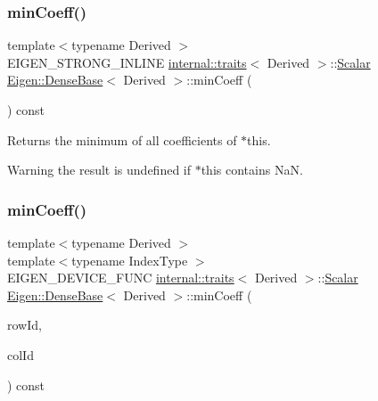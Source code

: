 \subsubsection{\texorpdfstring{minCoeff()}{minCoeff()}\hspace{0.1cm}{\footnotesize\ttfamily [1/3]}}
{\footnotesize\ttfamily template$<$typename Derived $>$ \\
E\+I\+G\+E\+N\+\_\+\+S\+T\+R\+O\+N\+G\+\_\+\+I\+N\+L\+I\+NE \mbox{\hyperlink{struct_eigen_1_1internal_1_1traits}{internal\+::traits}}$<$ Derived $>$\+::\mbox{\hyperlink{class_eigen_1_1_dense_base_a5feed465b3a8e60c47e73ecce83e39a2}{Scalar}} \mbox{\hyperlink{class_eigen_1_1_dense_base}{Eigen\+::\+Dense\+Base}}$<$ Derived $>$\+::min\+Coeff (\begin{DoxyParamCaption}{ }\end{DoxyParamCaption}) const}

\begin{DoxyReturn}{Returns}
the minimum of all coefficients of {\ttfamily $\ast$this}. 
\end{DoxyReturn}
\begin{DoxyWarning}{Warning}
the result is undefined if {\ttfamily $\ast$this} contains NaN. 
\end{DoxyWarning}
\mbox{\label{class_eigen_1_1_dense_base_a05044a037125e705d87bd28f678b914c}} 
\subsubsection{\texorpdfstring{minCoeff()}{minCoeff()}\hspace{0.1cm}{\footnotesize\ttfamily [2/3]}}
{\footnotesize\ttfamily template$<$typename Derived $>$ \\
template$<$typename Index\+Type $>$ \\
E\+I\+G\+E\+N\+\_\+\+D\+E\+V\+I\+C\+E\+\_\+\+F\+U\+NC \mbox{\hyperlink{struct_eigen_1_1internal_1_1traits}{internal\+::traits}}$<$ Derived $>$\+::\mbox{\hyperlink{class_eigen_1_1_dense_base_a5feed465b3a8e60c47e73ecce83e39a2}{Scalar}} \mbox{\hyperlink{class_eigen_1_1_dense_base}{Eigen\+::\+Dense\+Base}}$<$ Derived $>$\+::min\+Coeff (\begin{DoxyParamCaption}\item[{Index\+Type $\ast$}]{row\+Id,  }\item[{Index\+Type $\ast$}]{col\+Id }\end{DoxyParamCaption}) const}

